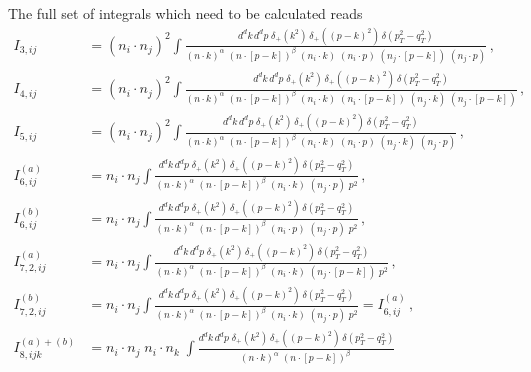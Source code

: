 \documentclass[a4paper,11pt]{report}
\numberwithin{equation}{section}
\begin{document}
The full set of integrals which need to be calculated reads 
%
\begin{subequations}
  \label{eq:fullset}
  \begin{align}
    I_{3, ij} &= 
    (n_i \cdot n_j)^2
    \int 
    \frac{d^d k\, d^d p\;\delta_+(k^2)\, \delta_+((p-k)^2)\,\delta(p_T^2-q_T^2)}
      {(n \cdot k)^\alpha\; (n \cdot [p-k])^\beta \; 
      (n_i \cdot k) \; (n_i \cdot p) \; (n_j \cdot [p-k]) \; (n_j \cdot p)} \, ,
    \\[0.7em]
    I_{4, ij} &= 
    (n_i \cdot n_j)^2
    \int 
    \frac{d^d k\, d^d p\;\delta_+(k^2)\, \delta_+((p-k)^2)\,\delta(p_T^2-q_T^2)}
      {(n \cdot k)^\alpha\; (n \cdot [p-k])^\beta \;
      (n_i \cdot k) \; (n_i \cdot [p-k]) \;
      (n_j \cdot k) \; (n_j \cdot [p-k])} \, ,
    \\[0.7em]
    I_{5, ij} &=
    (n_i \cdot n_j)^2
    \int 
    \frac{d^d k\, d^d p\;\delta_+(k^2)\, \delta_+((p-k)^2)\,\delta(p_T^2-q_T^2)}
      {(n \cdot k)^\alpha\; (n \cdot [p-k])^\beta  \;
      (n_i \cdot k) \; (n_i \cdot p) \; 
      (n_j \cdot k) \; (n_j \cdot p)} \, , 
    \\[0.7em]
    I^{(a)}_{6,ij} &=
    n_i \cdot n_j
     \int 
    \frac{d^d k\, d^d p\;\delta_+(k^2)\, \delta_+((p-k)^2)\,\delta(p_T^2-q_T^2)}
      {(n \cdot k)^\alpha\; (n \cdot [p-k])^\beta  \;
      (n_i \cdot k) \; (n_j \cdot p) \; p^2} \, , 
    \\[0.7em]
    I^{(b)}_{6,ij} &=
    n_i \cdot n_j
    \int 
    \frac{d^d k\, d^d p\;\delta_+(k^2)\, \delta_+((p-k)^2)\,\delta(p_T^2-q_T^2)}
      {(n \cdot k)^\alpha\; (n \cdot [p-k])^\beta  \;
      (n_i \cdot p) \; (n_j \cdot p) \; p^2} \, , 
    \\[0.7em]
    I^{(a)}_{7,2, ij} &=
    n_i \cdot n_j
    \int 
    \frac{d^d k\, d^d p\;\delta_+(k^2)\, \delta_+((p-k)^2)\,\delta(p_T^2-q_T^2)}
      {(n \cdot k)^\alpha\; (n \cdot [p-k])^\beta  \;
      (n_i \cdot k) \;  (n_j \cdot [p-k]) \; p^2} \, ,
    \\[0.7em]
    I^{(b)}_{7,2, ij} &=
    n_i \cdot n_j
    \int 
    \frac{d^d k\, d^d p\;\delta_+(k^2)\, \delta_+((p-k)^2)\,\delta(p_T^2-q_T^2)}
      {(n \cdot k)^\alpha\; (n \cdot [p-k])^\beta  \;
      (n_i \cdot k) \; (n_j \cdot p) \; p^2} = I^{(a)}_{6,ij}\, ,
    \\[0.7em]
    I_{8, ijk}^{(a)+(b)} &= 
    n_i \cdot n_j\; n_i \cdot n_k\; 
    \int 
    \frac{d^d k\, d^d p\;\delta_+(k^2)\, \delta_+((p-k)^2)\,\delta(p_T^2-q_T^2)}
      {(n \cdot k)^\alpha\; (n \cdot [p-k])^\beta \; 
}
\end{align}
\end{subequations}
\end{document}
